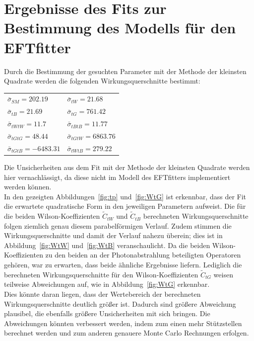 \section{Ergebnisse des Fits zur Bestimmung des Modells für den EFTfitter}
\label{Modell}
Durch die Bestimmung der gesuchten Parameter mit der Methode der kleinsten Quadrate werden die folgenden Wirkungsquerschnitte bestimmt:
\begin{table}[H]
    \centering
   \begin{tabular}{ll}
     $\bar{\sigma}_{SM}   = 202.19 $  & $\bar{\sigma}_{tW}   = 21.68$\\
     $\bar{\sigma}_{tB}   = 21.69$    & $\bar{\sigma}_{tG}   = 761.42$\\
     $\bar{\sigma}_{tWtW} = 11.7 $    & $\bar{\sigma}_{tBtB} = 11.77$\\
     $\bar{\sigma}_{tGtG} = 48.44$    & $\bar{\sigma}_{tGtW} = 6863.76$\\
     $\bar{\sigma}_{tGtB} = -6483.31$ & $\bar{\sigma}_{tWtB} = 279.22$
   \end{tabular}
\end{table}
Die Unsicherheiten aus dem Fit mit der Methode der kleinsten Quadrate werden hier vernachlässigt, da diese nicht im Modell des EFTfitters implementiert werden können.\\
In den gezeigten Abbildungen~\ref{fig:tp} und~\ref{fig:WtG} ist erkennbar, dass der Fit die erwartete quadratische Form in den jeweiligen Parametern aufweist.
Die für die beiden Wilson-Koeffizienten $\tilde{C}_{tW}$ und $\tilde{C}_{tB}$ berechneten Wirkungsquerschnitte folgen ziemlich genau diesem parabelförmigen Verlauf.
Zudem stimmen die Wirkungsquerschnitte und damit der Verlauf nahezu überein; dies ist in Abbildung~\ref{fig:WtW} und~\ref{fig:WtB} veranschaulicht. Da die beiden Wilson-Koeffizienten zu den beiden an der Photonabstrahlung beteiligten Operatoren gehören, war zu erwarten, dass beide ähnliche Ergebnisse liefern. Lediglich die berechneten Wirkungsquerschnitte für den Wilson-Koeffizienten $\tilde{C}_{tG}$ weisen teilweise Abweichungen auf, wie in Abbildung~\ref{fig:WtG} erkennbar.\\
Dies könnte daran liegen, dass der Wertebereich der berechneten Wirkungsquerschnitte deutlich größer ist. Dadurch sind größere Abweichung plausibel, die ebenfalls größere Unsicherheiten mit sich bringen. Die Abweichungen könnten verbessert werden, indem zum einen mehr Stützstellen berechnet werden und zum anderen genauere Monte Carlo Rechnungen erfolgen.\\
